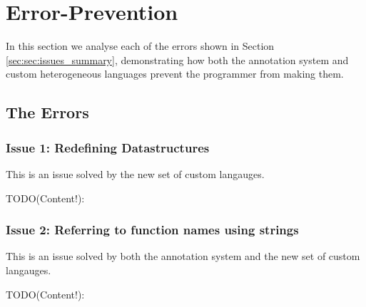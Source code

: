 \documentclass[a4paper,12pt,twoside,openright]{report}
\begin{document}




\section{Error-Prevention}

In this section we analyse each of the errors shown in Section
\ref{sec:sec:issues_summary}, demonstrating how both the annotation system and
custom heterogeneous languages prevent the programmer from making them.

\subsection{The Errors}

\subsubsection{Issue 1: Redefining Datastructures}

This is an issue solved by the new set of custom langauges.

TODO(Content!):

\subsubsection{Issue 2: Referring to function names using strings}

This is an issue solved by both the annotation system and the new set of custom
langauges.

TODO(Content!):

\end{document}
